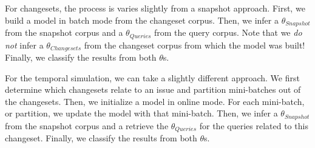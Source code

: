 For changesets, the process is varies slightly from a snapshot approach.
First, we build a model in batch mode from the changeset corpus.
Then, we infer a $\theta_{Snapshot}$ from the snapshot corpus
and a $\theta_{Queries}$ from the query corpus.
Note that we \emph{do not} infer a $\theta_{Changesets}$ from the changeset corpus from which the model was built!
Finally, we classify the results from both $\theta$s.

\begin{comment}
\begin{enumerate}
    \item Build model from the changeset corpus in batch mode
    \item \emph{Do not} infer a $\theta_{Changesets}$
    \item Infer a $\theta_{Snapshot}$ from the snapshot corpus
    \item Infer a  $\theta_{Queries}$ from the query corpus
    \item Classify, or rank, the results from both $\theta$s
\end{enumerate}
\end{comment}


For the temporal simulation, we can take a slightly different approach.
We first determine which changesets relate to an issue and partition mini-batches out of the changesets.
Then, we initialize a model in online mode.
For each mini-batch, or partition, we update the model with that mini-batch.
Then, we infer a $\theta_{Snapshot}$ from the snapshot corpus
and a retrieve the $\theta_{Queries}$ for the queries related to this changeset.
Finally, we classify the results from both $\theta$s.

\begin{comment}
\begin{enumerate}
    \item Initialize a model in online mode
    \item Determine which changesets relate to an issue and partition mini-batches out of the changesets
    \item For each mini-batch:
        \begin{enumerate}
            \item Update the model with mini-batch
            \item Update $\theta_{Snapshot}$ with the new inference of the source code document affected by this changeset
            \item Infer a $\theta_{Query}$ of the query related to the changeset we stopped at
            \item Classify, or rank, the results from both $\theta$s
        \end{enumerate}
\end{enumerate}
\end{comment}

